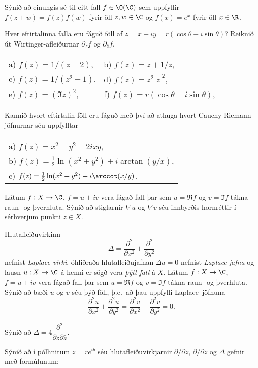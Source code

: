 \daemi
 Sýnið að einungis sé til eitt fall $f\in \O(\C)$ sem uppfyllir
$f(z+w)=f(z)f(w)$ fyrir öll $z,w\in \C$ og $f(x)=e^x$ fyrir öll $x\in
\R$. 

\daemi Hver eftirtalinna falla eru fáguð föll af 
$z=x+iy=r(\cos {\theta} +i\sin {\theta})$?  
Reiknið út Wirtinger-afleiðurnar $\partial_z f$  og 
$\partial_{\bar z}f$.

\smallskip\noindent
\begin{tabular}{ll}
a) $f(z)= 1/(z-2)$,
&b) $f(z)= z+1/z$, \\
c) $f(z)= 1/(z^2-1)$,
&d) $f(z)= z^2|z|^2$,\\
e) $f(z)= (\Im z)^2$,
&f) $f(z)= r(\cos {\theta}-i\sin {\theta})$,
\end{tabular}

\daemi Kannið hvort eftirtalin föll eru fáguð með því að athuga hvort
Cauchy-Riemann- jöfnurnar séu uppfylltar

\begin{tabular}{l}
a) $f(z)=x^2-y^2-2ixy$, \\
b) $f(z)=\frac 12\ln(x^2+y^2)+i\arctan(y/x)$,\\
c) $f(z)=\frac 12\ln(x^2+y^2)+i\arccot(x/y)$.
\end{tabular}

\daemi Látum $f: X\to \C$, $f=u+iv$ vera fágað fall þar sem $u=\Re f$
og $v=\Im f$ tákna raun- og þverhluta.  
Sýnið að stiglarnir $\nabla u$ og $\nabla v$ séu innbyrðis 
hornréttir í sérhverjum punkti $z\in X$.


\daemi Hlutafleiðuvirkinn
$$
{\Delta}=\dfrac {\partial^2 }{\partial x^2}+  
\dfrac {\partial^2 }{\partial y^2}
$$
nefnist {\it Laplace-virki},
óhliðraða hlutafleiðujafnan
${\Delta}u=0$ nefnist {\it
Laplace-jafna}
og lausn $u:X\to \C$ á  henni er sögð vera {\it þýtt fall} á $X$.
Látum $f: X\to \C$, $f=u+iv$ vera fágað fall þar sem $u=\Re f$
og $v=\Im f$ tákna raun- og þverhluta. 
 Sýnið að bæði $u$ og $v$ séu
þýð föll, þ.e.~að þau uppfylli Laplace--jöfnuna
$$
\dfrac {\partial^2 u}{\partial x^2}+  
\dfrac {\partial^2 u}{\partial y^2}=  
\dfrac {\partial^2 v}{\partial x^2}+  
\dfrac {\partial^2 v}{\partial y^2}=0.
$$

\daemi Sýnið að 
${\Delta}=4\dfrac{{\partial}^2}{{\partial}z{\partial}\bar z}$.


\daemi Sýnið að í pólhnitum $z=re^{i{\theta}}$ séu
hlutafleiðuvirkjarnir  ${\partial}/{\partial}z$,
${\partial}/{\partial}\bar z$ og ${\Delta}$  gefnir með formúlunum:

